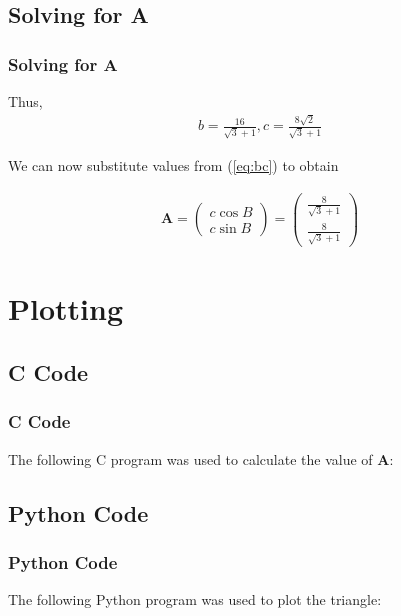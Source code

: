 \documentclass{beamer}
\theoremstyle{remark}
\newcommand{\myvec}[1]{\ensuremath{\begin{pmatrix}#1\end{pmatrix}}}
\let\vec\mathbf
\numberwithin{equation}{section}
\begin{document}
\subsection{Solving for A}
\begin{frame}
\frametitle{Solving for A}
Thus,
\begin{align}
    b = \frac{16}{\sqrt{3} + 1}, c = \frac{8\sqrt{2}}{\sqrt{3} + 1} \label{eq:bc}
\end{align}

We can now substitute values from (\ref{eq:bc}) to obtain

\begin{align}
    \vec{A} = \myvec{c\cos B \\ c\sin B} = \myvec{\frac{8}{\sqrt{3} + 1} \\ \frac{8}{\sqrt{3} + 1}}
\end{align}
\end{frame}

\section{Plotting}
\subsection{C Code}
\begin{frame}[allowframebreaks]
\frametitle{C Code}
    The following C program was used to calculate the value of $\vec{A}$:

    
\end{frame}

\subsection{Python Code}
\begin{frame}[allowframebreaks]
\frametitle{Python Code}
    The following Python program was used to plot the triangle:

    
\end{frame}
\end{document}
